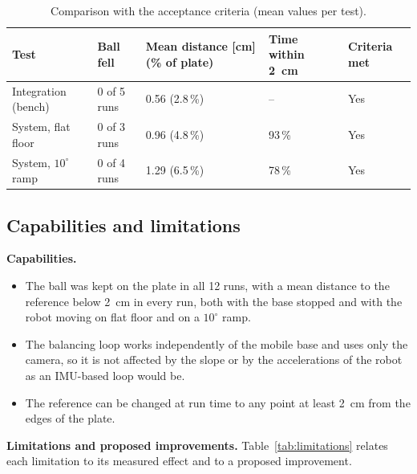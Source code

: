 \documentclass[11pt,letterpaper]{article}
\begin{document}
\begin{table}[H]
\centering
\caption{Comparison with the acceptance criteria (mean values per test).}
\label{tab:accept}
\small
\begin{tabularx}{\textwidth}{@{}L{3.6cm}YYYL{2.4cm}@{}}
\toprule
\textbf{Test} & \textbf{Ball fell} & \textbf{Mean distance [cm] (\% of plate)} & \textbf{Time within 2~cm} & \textbf{Criteria met} \\
\midrule
Integration (bench) & 0 of 5 runs & 0.56 (2.8\,\%) & -- & Yes \\
System, flat floor & 0 of 3 runs & 0.96 (4.8\,\%) & 93\,\% & Yes \\
System, $10^\circ$ ramp & 0 of 4 runs & 1.29 (6.5\,\%) & 78\,\% & Yes \\
\bottomrule
\end{tabularx}
\end{table}

\subsection{Capabilities and limitations}
\label{sec:limits}
\textbf{Capabilities.}
\begin{itemize}
    \item The ball was kept on the plate in all 12 runs, with a mean
    distance to the reference below 2~cm in every run, both with the base
    stopped and with the robot moving on flat floor and on a $10^\circ$
    ramp.
    \item The balancing loop works independently of the mobile base and
    uses only the camera, so it is not affected by the slope or by the
    accelerations of the robot as an IMU-based loop would be.
    \item The reference can be changed at run time to any point at least
    2~cm from the edges of the plate.
\end{itemize}
\textbf{Limitations and proposed improvements.} Table~\ref{tab:limitations}
relates each limitation to its measured effect and to a proposed
improvement.
\end{document}
